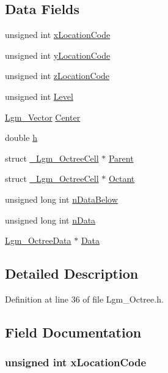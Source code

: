 \subsection*{Data Fields}
\begin{CompactItemize}
\item 
unsigned int \hyperlink{struct___lgm___octree_cell_068d265e1d6fb7a08db0fd289db2b3ae}{xLocationCode}
\item 
unsigned int \hyperlink{struct___lgm___octree_cell_fd9d41af65e45952ff7a6ec326f8ce86}{yLocationCode}
\item 
unsigned int \hyperlink{struct___lgm___octree_cell_197011505d40af9f13649872c67a61e1}{zLocationCode}
\item 
unsigned int \hyperlink{struct___lgm___octree_cell_a3d2c0758a70c3bb49a3d73a14a94d0a}{Level}
\item 
\hyperlink{struct_lgm___vector}{Lgm\_\-Vector} \hyperlink{struct___lgm___octree_cell_6db57193d204ce24705e3e95a23bc7c1}{Center}
\item 
double \hyperlink{struct___lgm___octree_cell_8ee9be1b5aa75abae556de3088cba6d9}{h}
\item 
struct \hyperlink{struct___lgm___octree_cell}{\_\-Lgm\_\-OctreeCell} $\ast$ \hyperlink{struct___lgm___octree_cell_4adbef09447a8b0f9932cec8c5e507ee}{Parent}
\item 
struct \hyperlink{struct___lgm___octree_cell}{\_\-Lgm\_\-OctreeCell} $\ast$ \hyperlink{struct___lgm___octree_cell_3a1ad61cfa92956310b1584c5c9ccb80}{Octant}
\item 
unsigned long int \hyperlink{struct___lgm___octree_cell_783709cb5c4b14570bf342099817323d}{nDataBelow}
\item 
unsigned long int \hyperlink{struct___lgm___octree_cell_c6f35f845cda4fa90dc63051fc4f061a}{nData}
\item 
\hyperlink{struct___lgm___octree_data}{Lgm\_\-OctreeData} $\ast$ \hyperlink{struct___lgm___octree_cell_173e4af4e76fa34ce187cdf4c913e9d3}{Data}
\end{CompactItemize}


\subsection{Detailed Description}


Definition at line 36 of file Lgm\_\-Octree.h.

\subsection{Field Documentation}
\hypertarget{struct___lgm___octree_cell_068d265e1d6fb7a08db0fd289db2b3ae}{
\subsubsection[{xLocationCode}]{\setlength{\rightskip}{0pt plus 5cm}unsigned int {\bf xLocationCode}}}
\label{struct___lgm___octree_cell_068d265e1d6fb7a08db0fd289db2b3ae}




